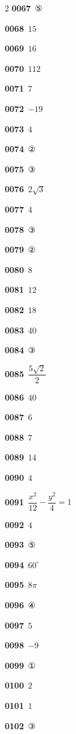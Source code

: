 \documentclass[10pt,a4paper]{article}
\begin{document}
\begin{multicols}{2}
\noindent\textbf{0067}\ ⑤\par
\noindent\textbf{0068}\ $15$\par
\noindent\textbf{0069}\ $16$\par
\noindent\textbf{0070}\ $112$\par
\noindent\textbf{0071}\ $7$\par
\noindent\textbf{0072}\ $-19$\par
\noindent\textbf{0073}\ $4$\par
\noindent\textbf{0074}\ ②\par
\noindent\textbf{0075}\ ③\par
\noindent\textbf{0076}\ $2\sqrt{3}$\par
\noindent\textbf{0077}\ $4$\par
\noindent\textbf{0078}\ ③\par
\noindent\textbf{0079}\ ②\par
\noindent\textbf{0080}\ $8$\par
\noindent\textbf{0081}\ $12$\par
\noindent\textbf{0082}\ $18$\par
\noindent\textbf{0083}\ $40$\par
\noindent\textbf{0084}\ ③\par
\noindent\textbf{0085}\ $\dfrac{5\sqrt{2}}{2}$\par
\noindent\textbf{0086}\ $40$\par
\noindent\textbf{0087}\ $6$\par
\noindent\textbf{0088}\ $7$\par
\noindent\textbf{0089}\ $14$\par
\noindent\textbf{0090}\ $4$\par
\noindent\textbf{0091}\ $\dfrac{x^2}{12}-\dfrac{y^2}{4}=1$\par
\noindent\textbf{0092}\ $4$\par
\noindent\textbf{0093}\ ⑤\par
\noindent\textbf{0094}\ $60^\circ$\par
\noindent\textbf{0095}\ $8\pi$\par
\noindent\textbf{0096}\ ④\par
\noindent\textbf{0097}\ $5$\par
\noindent\textbf{0098}\ $-9$\par
\noindent\textbf{0099}\ ①\par
\noindent\textbf{0100}\ $2$\par
\noindent\textbf{0101}\ $1$\par
\noindent\textbf{0102}\ ③\par

\end{multicols}
\end{document}
